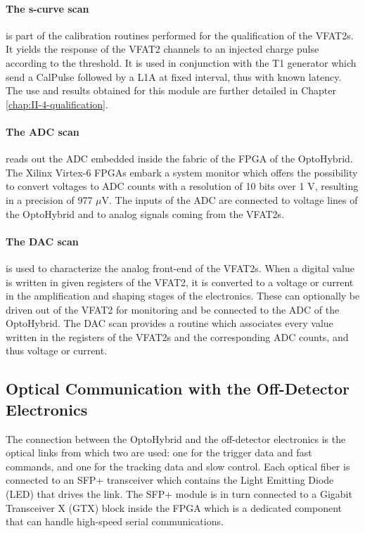       \paragraph{The s-curve scan} is part of the calibration routines performed for the qualification of the VFAT2s. It yields the response of the VFAT2 channels to an injected charge pulse according to the threshold. It is used in conjunction with the T1 generator which send a CalPulse followed by a L1A at fixed interval, thus with known latency. The use and results obtained for this module are further detailed in Chapter \ref{chap:II-4-qualification}.

      \paragraph{The ADC scan} reads out the ADC embedded inside the fabric of the FPGA of the OptoHybrid. The Xilinx Virtex-6 FPGAs embark a system monitor \cite{VIRTEX-SYSMON} which offers the possibility to convert voltages to ADC counts with a resolution of 10 bits over 1 V, resulting in a precision of 977 $\mu$V. The inputs of the ADC are connected to voltage lines of the OptoHybrid and to analog signals coming from the VFAT2s.

      \paragraph{The DAC scan} is used to characterize the analog front-end of the VFAT2s. When a digital value is written in given registers of the VFAT2, it is converted to a voltage or current in the amplification and shaping stages of the electronics. These can optionally be driven out of the VFAT2 for monitoring and be connected to the ADC of the OptoHybrid. The DAC scan provides a routine which associates every value written in the registers of the VFAT2s and the corresponding ADC counts, and thus voltage or current.

    \subsection{Optical Communication with the Off-Detector Electronics}

      The connection between the OptoHybrid and the off-detector electronics is the optical links from which two are used: one for the trigger data and fast commands, and one for the tracking data and slow control. Each optical fiber is connected to an SFP+ transceiver which contains the Light Emitting Diode (LED) that drives the link. The SFP+ module is in turn connected to a Gigabit Transceiver X (GTX) block inside the FPGA which is a dedicated component that can handle high-speed serial communications.

